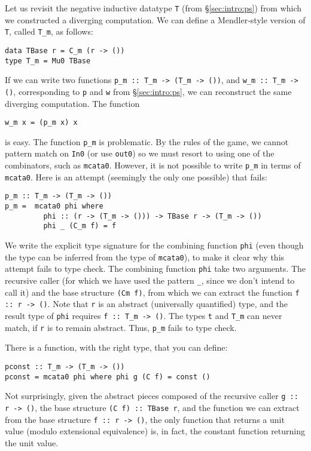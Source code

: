 \documentclass[letterpaper,12pt]{article}
\begin{document}
Let us revisit the negative inductive datatype \verb|T|
(from \S\ref{sec:intro:ps})
from which we constructed a diverging computation.
We can define a Mendler-style version of \verb|T|, called \verb|T_m|, as follows:
\begin{verbatim}
data TBase r = C_m (r -> ())
type T_m = Mu0 TBase
\end{verbatim}
If we can write two functions \verb|p_m :: T_m -> (T_m -> ())|,
and \verb|w_m :: T_m -> ()|, corresponding to \verb|p| and \verb|w| from
\S\ref{sec:intro:ps}, we can reconstruct the same diverging computation.
The function
\begin{verbatim}
w_m x = (p_m x) x
\end{verbatim}
is easy. The function
\verb|p_m| is problematic. By the rules of the game,
we cannot pattern match on \verb|In0|
(or use \verb|out0|) so we must resort to using one of the
combinators, such as \verb|mcata0|.
However, it is not possible to write \verb|p_m|
in terms of \verb|mcata0|.
Here is an attempt (seemingly the only one possible) that fails:
\begin{verbatim}
p_m :: T_m -> (T_m -> ())
p_m =  mcata0 phi where
         phi :: (r -> (T_m -> ())) -> TBase r -> (T_m -> ())
         phi _ (C_m f) = f
\end{verbatim}
We write the explicit type signature for the combining function \verb|phi|
(even though the type can be inferred from the type of \verb|mcata0|),
to make it clear why this attempt fails to type check. The combining
function \verb|phi| take two arguments. The recursive caller (for which we
have used the pattern \verb|_|, since we don't intend to call it) and the
base structure \verb|(Cm f)|, from which we can extract
the function \verb|f :: r -> ()|. Note that \verb|r| is an abstract
(universally quantified) type, and the result type of \verb|phi| requires
\verb|f :: T_m -> ()|. The types \verb|t| and \verb|T_m| can never match, if \verb|r|
is to remain abstract. Thus, \verb|p_m| fails to type check.

There is a function, with the right type, that you can define:
\begin{verbatim}
pconst :: T_m -> (T_m -> ())
pconst = mcata0 phi where phi g (C f) = const ()
\end{verbatim}
Not surprisingly, given the abstract pieces composed of
the recursive caller \verb|g :: r -> ()|, the base structure \verb|(C f) :: TBase r|,
and the function we can extract from the base structure \verb|f :: r -> ()|,
the only function that returns a unit value (modulo extensional
equivalence) is, in fact, the constant function returning the unit value.
\end{document}
